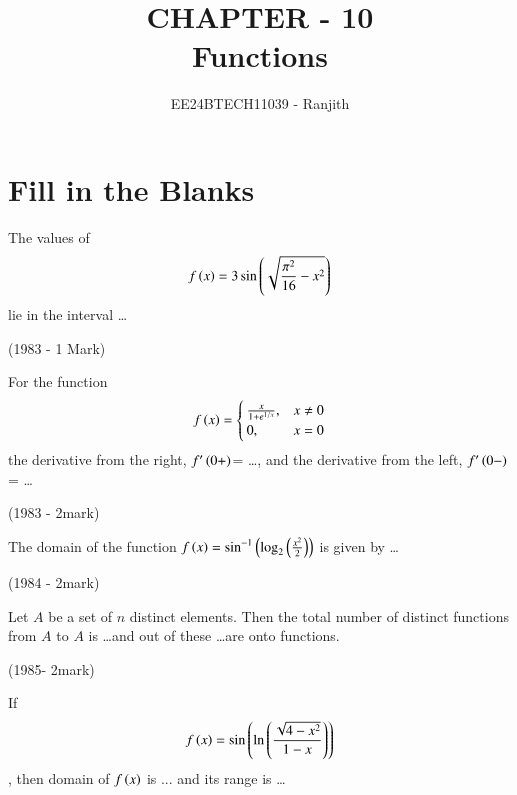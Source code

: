\documentclass[journal]{IEEEtran}
\begin{document}

\onecolumn

\title{CHAPTER - 10\\Functions}
\author{EE24BTECH11039 - Ranjith}
\maketitle


\renewcommand{\thefigure}{\theenumi}
\renewcommand{\thetable}{\theenumi}


\section{ Fill in the Blanks}


\begin{enumerate}
    \item The values of \begin{align*}f\left(x\right)=3\sin\left(\sqrt{\frac{\pi^2}{16}-x^2}\right)\end{align*}lie in the interval \dots 
    
    
    \hfill{(1983 - 1 Mark)}
    
    
     \item For the function \begin{align*}f\left(x\right) = \begin{cases} \frac{x}{1 + e^{1/x}}, & x \neq 0 \\ 0, & x = 0 \end{cases} \end{align*}
    the derivative from the right, $f^{\prime}\left(0+\right) $= \dots , and the derivative from the left, $f^{\prime }\left(0-\right)$= \dots
    
    
     
    \hfill{(1983 - 2mark)}
    
    \item{The domain of the function $f\left(x\right)=\sin^{-1}\left(\log_{2}\left(\frac{x^{2}}{2}\right)\right)$ is given by \dots
    
    
    \hfill 
    {(1984 - 2mark)}
    
    \item Let $A$ be a set of $n$ distinct elements. Then the total number of distinct functions from $ A $ to $ A $ is \dots  and out of these \dots are onto functions.
    
    \hfill
    {(1985- 2mark)}
    
    
    \item If \begin{align*}  f\left(x\right) = \sin \left( \ln \left( \frac{\sqrt{4 - x^{2}}}{1 - x}\right)\right) \end{align*},  then domain of  $f\left(x\right)$ is ... and its range is \dots
    
}
\end{enumerate}
\end{document}
